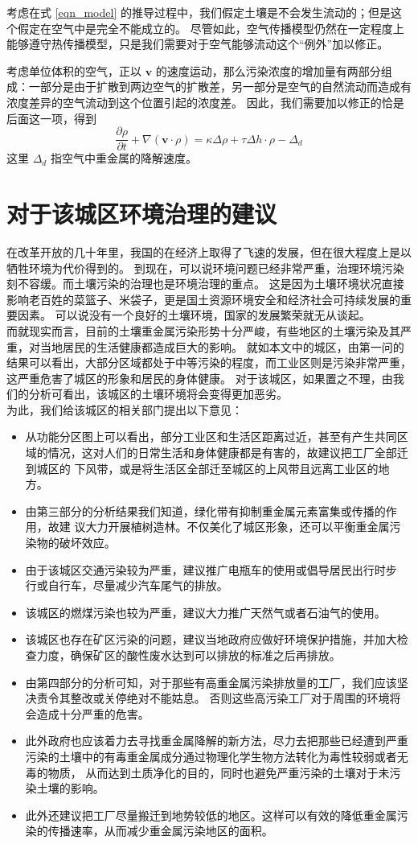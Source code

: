 \documentclass[a4paper]{article}
\begin{document}
考虑在式 \eqref{eqn_model} 的推导过程中，我们假定土壤是不会发生流动的；但是这个假定在空气中是完全不能成立的。
尽管如此，空气传播模型仍然在一定程度上能够遵守热传播模型，只是我们需要对于空气能够流动这个“例外”加以修正。

考虑单位体积的空气，正以 $\textbf{v}$ 的速度运动，那么污染浓度的增加量有两部分组成：一部分是由于扩散到两边空气的扩散差，另一部分是空气的自然流动而造成有浓度差异的空气流动到这个位置引起的浓度差。
因此，我们需要加以修正的恰是后面这一项，得到
$$ \frac{\partial \rho}{\partial t} + \nabla(\textbf{v} \cdot \rho) = \kappa \Delta \rho + \tau \Delta h \cdot \rho - \Delta_d  $$
这里 $\Delta_d$ 指空气中重金属的降解速度。


\part{对于该城区环境治理的建议}
在改革开放的几十年里，我国的在经济上取得了飞速的发展，但在很大程度上是以牺牲环境为代价得到的。
到现在，可以说环境问题已经非常严重，治理环境污染刻不容缓。而土壤污染的治理也是环境治理的重点。
这是因为土壤环境状况直接影响老百姓的菜篮子、米袋子，更是国土资源环境安全和经济社会可持续发展的重要因素。
可以说没有一个良好的土壤环境，国家的发展繁荣就无从谈起。  \\
\indent 而就现实而言，目前的土壤重金属污染形势十分严峻，有些地区的土壤污染及其严重，对当地居民的生活健康都造成巨大的影响。
就如本文中的城区，由第一问的结果可以看出，大部分区域都处于中等污染的程度，而工业区则是污染非常严重，这严重危害了城区的形象和居民的身体健康。
对于该城区，如果置之不理，由我们的分析可看出，该城区的土壤环境将会变得更加恶劣。  \\
\indent 为此，我们给该城区的相关部门提出以下意见：
\begin{itemize}
\item 从功能分区图上可以看出，部分工业区和生活区距离过近，甚至有产生共同区
域的情况，这对人们的日常生活和身体健康都是有害的，故建议把工厂全部迁到城区的
下风带，或是将生活区全部迁至城区的上风带且远离工业区的地方。
\item 由第三部分的分析结果我们知道，绿化带有抑制重金属元素富集或传播的作用，故建
议大力开展植树造林。不仅美化了城区形象，还可以平衡重金属污染物的破坏效应。
\item 由于该城区交通污染较为严重，建议推广电瓶车的使用或倡导居民出行时步
行或自行车，尽量减少汽车尾气的排放。
\item 该城区的燃煤污染也较为严重，建议大力推广天然气或者石油气的使用。
\item 该城区也存在矿区污染的问题，建议当地政府应做好环境保护措施，并加大检
查力度，确保矿区的酸性废水达到可以排放的标准之后再排放。
\item 由第四部分的分析可知，对于那些有高重金属污染排放量的工厂，我们应该坚决责令其整改或关停绝对不能姑息。
否则这些高污染工厂对于周围的环境将会造成十分严重的危害。
\item 此外政府也应该着力去寻找重金属降解的新方法，尽力去把那些已经遭到严重污染的土壤中的有毒重金属成分通过物理化学生物方法转化为毒性较弱或者无毒的物质，
从而达到土质净化的目的，同时也避免严重污染的土壤对于未污染土壤的影响。
\item 此外还建议把工厂尽量搬迁到地势较低的地区。这样可以有效的降低重金属污染的传播速率，从而减少重金属污染地区的面积。
\end{itemize}
\end{document}
